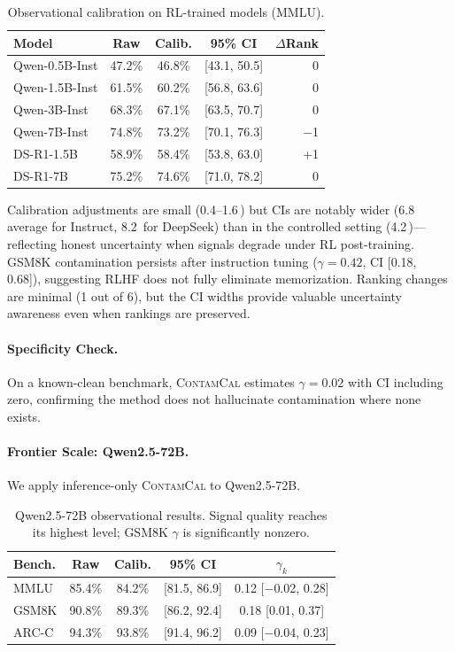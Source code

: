 \documentclass[11pt,a4paper]{article}
\newcommand{\contamcal}{\textsc{ContamCal}}
\newcommand{\pp}{\,\text{pp}}
\begin{document}
\begin{table}[t]
\centering
\small
\caption{Observational calibration on RL-trained models (MMLU).}
\label{tab:observational}
\begin{tabular}{lcccr}
\toprule
\textbf{Model} & \textbf{Raw} & \textbf{Calib.} & \textbf{95\% CI} & $\Delta$\textbf{Rank} \\
\midrule
Qwen-0.5B-Inst & 47.2\% & 46.8\% & [43.1, 50.5] & 0 \\
Qwen-1.5B-Inst & 61.5\% & 60.2\% & [56.8, 63.6] & 0 \\
Qwen-3B-Inst   & 68.3\% & 67.1\% & [63.5, 70.7] & 0 \\
Qwen-7B-Inst   & 74.8\% & 73.2\% & [70.1, 76.3] & $-$1 \\
DS-R1-1.5B     & 58.9\% & 58.4\% & [53.8, 63.0] & +1 \\
DS-R1-7B       & 75.2\% & 74.6\% & [71.0, 78.2] & 0 \\
\bottomrule
\end{tabular}
\end{table}

Calibration adjustments are small (0.4--1.6\pp{}) but CIs are notably wider (6.8\pp{} average for Instruct, 8.2\pp{} for DeepSeek) than in the controlled setting (4.2\pp{})---reflecting honest uncertainty when signals degrade under RL post-training.
GSM8K contamination persists after instruction tuning ($\gamma = 0.42$, CI [0.18, 0.68]), suggesting RLHF does not fully eliminate memorization.
Ranking changes are minimal (1 out of 6), but the CI widths provide valuable uncertainty awareness even when rankings are preserved.

\paragraph{Specificity Check.}
On a known-clean benchmark, \contamcal{} estimates $\gamma = 0.02$ with CI including zero, confirming the method does not hallucinate contamination where none exists.

\paragraph{Frontier Scale: Qwen2.5-72B.}
We apply inference-only \contamcal{} to Qwen2.5-72B.

\begin{table}[t]
\centering
\small
\caption{Qwen2.5-72B observational results. Signal quality reaches its highest level; GSM8K $\gamma$ is significantly nonzero.}
\label{tab:72b}
\begin{tabular}{lcccc}
\toprule
\textbf{Bench.} & \textbf{Raw} & \textbf{Calib.} & \textbf{95\% CI} & $\gamma_k$ \\
\midrule
MMLU  & 85.4\% & 84.2\% & [81.5, 86.9] & 0.12 [$-$0.02, 0.28] \\
GSM8K & 90.8\% & 89.3\% & [86.2, 92.4] & 0.18 [0.01, 0.37] \\
ARC-C & 94.3\% & 93.8\% & [91.4, 96.2] & 0.09 [$-$0.04, 0.23] \\
\bottomrule
\end{tabular}
\end{table}
\end{document}
